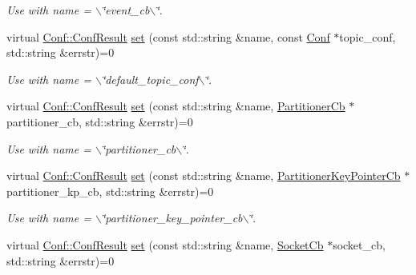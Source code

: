 \begin{DoxyCompactItemize}
\begin{DoxyCompactList}\small\item\em Use with {\ttfamily name} = {\ttfamily $\backslash$\char`\"{}event\_\-cb$\backslash$\char`\"{}}. \item\end{DoxyCompactList}\item 
virtual \hyperlink{classRdKafka_1_1Conf_a1d023a689c09f42ab18b7bd1d15a11a6}{Conf::ConfResult} \hyperlink{classRdKafka_1_1Conf_a542b0c4e968979dce8c0d3f4792c765b}{set} (const std::string \&name, const \hyperlink{classRdKafka_1_1Conf}{Conf} $\ast$topic\_\-conf, std::string \&errstr)=0
\begin{DoxyCompactList}\small\item\em Use with {\ttfamily name} = {\ttfamily $\backslash$\char`\"{}default\_\-topic\_\-conf$\backslash$\char`\"{}}. \item\end{DoxyCompactList}\item 
\hypertarget{classRdKafka_1_1Conf_ae4e52f57b1cd216ad657095bd90659b1}{
virtual \hyperlink{classRdKafka_1_1Conf_a1d023a689c09f42ab18b7bd1d15a11a6}{Conf::ConfResult} \hyperlink{classRdKafka_1_1Conf_ae4e52f57b1cd216ad657095bd90659b1}{set} (const std::string \&name, \hyperlink{classRdKafka_1_1PartitionerCb}{PartitionerCb} $\ast$partitioner\_\-cb, std::string \&errstr)=0}
\label{classRdKafka_1_1Conf_ae4e52f57b1cd216ad657095bd90659b1}

\begin{DoxyCompactList}\small\item\em Use with {\ttfamily name} = {\ttfamily $\backslash$\char`\"{}partitioner\_\-cb$\backslash$\char`\"{}}. \item\end{DoxyCompactList}\item 
\hypertarget{classRdKafka_1_1Conf_a2243832a848942f85a537dc3eaaeaf72}{
virtual \hyperlink{classRdKafka_1_1Conf_a1d023a689c09f42ab18b7bd1d15a11a6}{Conf::ConfResult} \hyperlink{classRdKafka_1_1Conf_a2243832a848942f85a537dc3eaaeaf72}{set} (const std::string \&name, \hyperlink{classRdKafka_1_1PartitionerKeyPointerCb}{PartitionerKeyPointerCb} $\ast$partitioner\_\-kp\_\-cb, std::string \&errstr)=0}
\label{classRdKafka_1_1Conf_a2243832a848942f85a537dc3eaaeaf72}

\begin{DoxyCompactList}\small\item\em Use with {\ttfamily name} = {\ttfamily $\backslash$\char`\"{}partitioner\_\-key\_\-pointer\_\-cb$\backslash$\char`\"{}}. \item\end{DoxyCompactList}\item 
\hypertarget{classRdKafka_1_1Conf_aa10c8c7f4e88d733509dd0a549a0628d}{
virtual \hyperlink{classRdKafka_1_1Conf_a1d023a689c09f42ab18b7bd1d15a11a6}{Conf::ConfResult} \hyperlink{classRdKafka_1_1Conf_aa10c8c7f4e88d733509dd0a549a0628d}{set} (const std::string \&name, \hyperlink{classRdKafka_1_1SocketCb}{SocketCb} $\ast$socket\_\-cb, std::string \&errstr)=0}
\label{classRdKafka_1_1Conf_aa10c8c7f4e88d733509dd0a549a0628d}


\end{DoxyCompactItemize}
